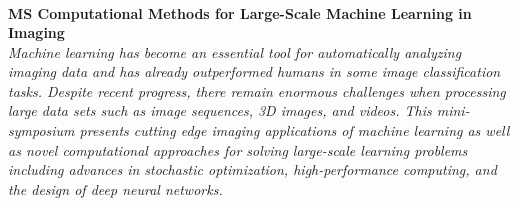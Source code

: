 \begin{multicols}{2}
        \\
        \\\\
        \\
        \\\\
        \\
        \\\\
        \\
        \\\\
        \\
        \\\\
\\
\end{multicols}
  \noindent\textbf{MS Computational Methods for Large-Scale Machine Learning in Imaging}\\
  \textit{Machine learning has become an essential tool for automatically analyzing imaging data and has already outperformed humans in some image classification tasks. Despite recent progress, there remain enormous challenges when processing large data sets such as image sequences, 3D images, and videos. This mini-symposium presents cutting edge imaging applications of machine learning as well as novel computational approaches for solving large-scale learning problems including advances in stochastic optimization, high-performance computing, and the design of deep neural networks.} \\
    
